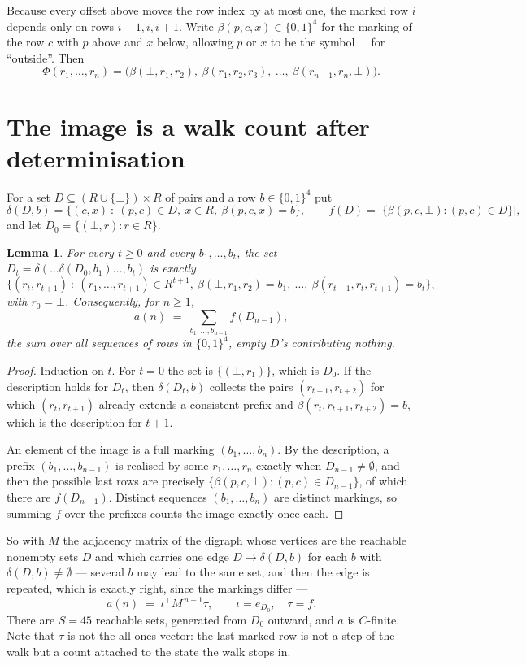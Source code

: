 \documentclass[11pt,a4paper]{article}
\theoremstyle{plain}
\newtheorem{lemma}[theorem]{Lemma}
\theoremstyle{definition}
\begin{document}
Because every offset above moves the row index by at most one, the marked row $i$ depends only
on rows $i-1,i,i+1$. Write $\beta(p,c,x)\in\{0,1\}^{4}$ for the marking of the row $c$
with $p$ above and $x$ below, allowing $p$ or $x$ to be the symbol $\bot$ for ``outside''.
Then
\[
\Phi(r_1,\dots,r_n)=\bigl(\beta(\bot,r_1,r_2),\ \beta(r_1,r_2,r_3),\ \dots,\
\beta(r_{n-1},r_n,\bot)\bigr).
\]

\section{The image is a walk count after determinisation}

For a set $D\subseteq(R\cup\{\bot\})\times R$ of pairs and a row $b\in\{0,1\}^{4}$ put
\[
\delta(D,b)=\{(c,x)\ :\ (p,c)\in D,\ x\in R,\ \beta(p,c,x)=b\},\qquad
f(D)=\bigl|\{\beta(p,c,\bot):(p,c)\in D\}\bigr| ,
\]
and let $D_0=\{(\bot,r):r\in R\}$.

\begin{lemma}\label{lem:det}
For every $t\ge0$ and every $b_1,\dots,b_t$, the set
$D_t=\delta(\dots\delta(D_0,b_1)\dots,b_t)$ is exactly
\[
\{(r_t,r_{t+1})\ :\ (r_1,\dots,r_{t+1})\in R^{t+1},\ \beta(\bot,r_1,r_2)=b_1,\ \dots,\
\beta(r_{t-1},r_t,r_{t+1})=b_t\} ,
\]
with $r_0=\bot$. Consequently, for $n\ge1$,
\[
a(n)\;=\;\sum_{b_1,\dots,b_{n-1}}f(D_{n-1}),
\]
the sum over all sequences of rows in $\{0,1\}^{4}$, empty $D$'s contributing nothing.
\end{lemma}

\begin{proof}
Induction on $t$. For $t=0$ the set is $\{(\bot,r_1)\}$, which is $D_0$. If the description
holds for $D_t$, then $\delta(D_t,b)$ collects the pairs $(r_{t+1},r_{t+2})$ for which
$(r_t,r_{t+1})$ already extends a consistent prefix and
$\beta(r_t,r_{t+1},r_{t+2})=b$, which is the description for $t+1$.

An element of the image is a full marking $(b_1,\dots,b_n)$. By the description, a prefix
$(b_1,\dots,b_{n-1})$ is realised by some $r_1,\dots,r_n$ exactly when $D_{n-1}\neq
\emptyset$, and then the possible last rows are precisely
$\{\beta(p,c,\bot):(p,c)\in D_{n-1}\}$, of which there are $f(D_{n-1})$. Distinct
sequences $(b_1,\dots,b_n)$ are distinct markings, so summing $f$ over the prefixes counts the
image exactly once each.
\end{proof}

So with $M$ the adjacency matrix of the digraph whose vertices are the reachable nonempty sets
$D$ and which carries one edge $D\to\delta(D,b)$ for each $b$ with $\delta(D,b)\neq\emptyset$
--- several $b$ may lead to the same set, and then the edge is repeated, which is exactly
right, since the markings differ ---
\[
a(n)\;=\;\iota^{\!\top}M^{\,n-1}\tau,\qquad \iota=e_{D_0},\quad \tau=f .
\]
There are $S=45$ reachable sets, generated from $D_0$ outward, and $a$ is $C$-finite. Note
that $\tau$ is not the all-ones vector: the last marked row is not a step of the walk but a
count attached to the state the walk stops in.
\end{document}
